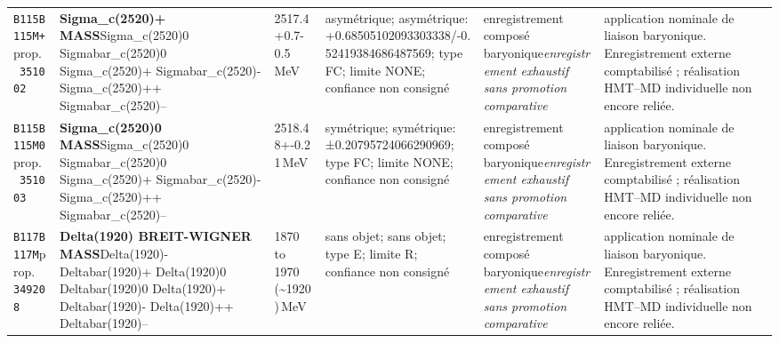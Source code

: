 \begin{landscape}
\begin{longtable}{L{1.85cm}L{4.45cm}L{2.35cm}L{4.05cm}L{3.35cm}L{7.15cm}}
\texttt{B115}\newline \texttt{B115M+}\newline prop.\ \texttt{351002} & \textbf{Sigma\_\allowbreak{}c(2520)+ MASS}\newline Sigma\_\allowbreak{}c(2520)0 \textbar{}\allowbreak{} Sigmabar\_\allowbreak{}c(2520)0 \textbar{}\allowbreak{} Sigma\_\allowbreak{}c(2520)+ \textbar{}\allowbreak{} Sigmabar\_\allowbreak{}c(2520)- \textbar{}\allowbreak{} Sigma\_\allowbreak{}c(2520)++ \textbar{}\allowbreak{} Sigmabar\_\allowbreak{}c(2520)-- & 2517.4+0.7-0.5\,MeV & asymétrique; asymétrique: +0.68505102093303338/-0.52419384686487569; type FC; limite NONE; confiance non consigné & enregistrement composé baryonique\newline \emph{enregistrement exhaustif sans promotion comparative} & application nominale de liaison baryonique. Enregistrement externe comptabilisé ; réalisation HMT--MD individuelle non encore reliée. \\
\texttt{B115}\newline \texttt{B115M0}\newline prop.\ \texttt{351003} & \textbf{Sigma\_\allowbreak{}c(2520)0 MASS}\newline Sigma\_\allowbreak{}c(2520)0 \textbar{}\allowbreak{} Sigmabar\_\allowbreak{}c(2520)0 \textbar{}\allowbreak{} Sigma\_\allowbreak{}c(2520)+ \textbar{}\allowbreak{} Sigmabar\_\allowbreak{}c(2520)- \textbar{}\allowbreak{} Sigma\_\allowbreak{}c(2520)++ \textbar{}\allowbreak{} Sigmabar\_\allowbreak{}c(2520)-- & 2518.48+-0.21\,MeV & symétrique; symétrique: ±0.20795724066290969; type FC; limite NONE; confiance non consigné & enregistrement composé baryonique\newline \emph{enregistrement exhaustif sans promotion comparative} & application nominale de liaison baryonique. Enregistrement externe comptabilisé ; réalisation HMT--MD individuelle non encore reliée. \\
\texttt{B117}\newline \texttt{B117M}\newline prop.\ \texttt{349208} & \textbf{Delta(1920) BREIT-WIGNER MASS}\newline Delta(1920)- \textbar{}\allowbreak{} Deltabar(1920)+ \textbar{}\allowbreak{} Delta(1920)0 \textbar{}\allowbreak{} Deltabar(1920)0 \textbar{}\allowbreak{} Delta(1920)+ \textbar{}\allowbreak{} Deltabar(1920)- \textbar{}\allowbreak{} Delta(1920)++ \textbar{}\allowbreak{} Deltabar(1920)-- & 1870 to 1970 (\textasciitilde{}1920)\,MeV & sans objet; sans objet; type E; limite R; confiance non consigné & enregistrement composé baryonique\newline \emph{enregistrement exhaustif sans promotion comparative} & application nominale de liaison baryonique. Enregistrement externe comptabilisé ; réalisation HMT--MD individuelle non encore reliée. \\

\end{longtable}
\end{landscape}

